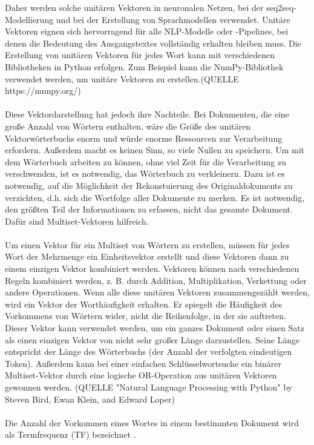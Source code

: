 Daher werden solche unitären Vektoren in neuronalen Netzen, bei der \ac{seq2seq}-Modellierung und bei der Erstellung von Sprachmodellen verwendet. 
Unitäre Vektoren eignen sich hervorragend für alle \ac{NLP}-Modelle oder -Pipelines, bei denen die Bedeutung des Ausgangstextes vollständig erhalten bleiben muss.
Die Erstellung von unitären Vektoren für jedes Wort kann mit verschiedenen Bibliotheken in Python erfolgen. 
Zum Beispiel kann die NumPy-Bibliothek verwendet werden, um unitäre Vektoren zu erstellen.(QUELLE https://numpy.org/)\\\\
Diese Vektordarstellung hat jedoch ihre Nachteile. 
Bei Dokumenten, die eine große Anzahl von Wörtern enthalten, wäre die Größe des unitären Vektorwörterbuchs enorm und würde enorme Ressourcen zur Verarbeitung erfordern. 
Außerdem macht es keinen Sinn, so viele Nullen zu speichern. 
Um mit dem Wörterbuch arbeiten zu können, ohne viel Zeit für die Verarbeitung zu verschwenden, ist es notwendig, das Wörterbuch zu verkleinern. 
Dazu ist es notwendig, auf die Möglichkeit der Rekonstuierung des Originaldokuments zu verzichten, d.h. sich die Wortfolge aller Dokumente zu merken. 
Es ist notwendig, den größten Teil der Informationen zu erfassen, nicht das gesamte Dokument. Dafür sind Multiset-Vektoren hilfreich.\\\\
Um einen Vektor für ein Multiset von Wörtern zu erstellen, müssen für jedes Wort der Mehrmenge ein Einheitsvektor erstellt und diese Vektoren dann zu einem einzigen Vektor kombiniert werden. 
Vektoren können nach verschiedenen Regeln kombiniert werden, z. B. durch Addition, Multiplikation, Verkettung oder andere Operationen. 
Wenn alle diese unitären Vektoren zusammengezählt werden, wird ein Vektor der Worthäufigkeit erhalten. 
Er spiegelt die Häufigkeit des Vorkommens von Wörtern wider, nicht die Reihenfolge, in der sie auftreten. 
Dieser Vektor kann verwendet werden, um ein ganzes Dokument oder einen Satz als einen einzigen Vektor von nicht sehr großer Länge darzustellen. 
Seine Länge entspricht der Länge des Wörterbuchs (der Anzahl der verfolgten eindeutigen Token). 
Außerdem kann bei einer einfachen Schlüsselwortsuche ein binärer Multiset-Vektor durch eine logische OR-Operation aus unitären Vektoren gewonnen werden. (QUELLE "Natural Language Processing with Python" by Steven Bird, Ewan Klein, and Edward Loper)\\\\
Die Anzahl der Vorkommen eines Wortes in einem bestimmten Dokument wird als Termfrequenz (\ac{TF}) bezeichnet \cite{lane_natural_2019}. 

